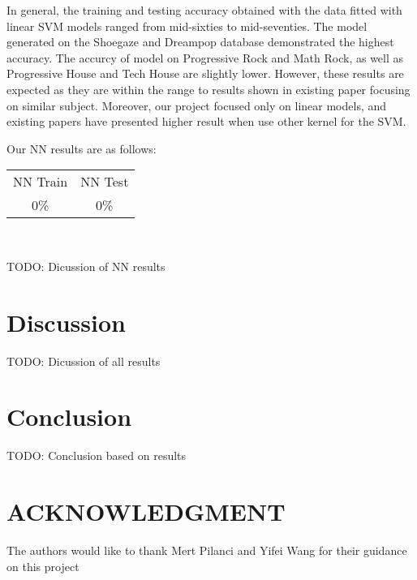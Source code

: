 \documentclass[letterpaper, 12 pt, conference]{ieeeconf}  %
\begin{document}
\par In general, the training and testing accuracy obtained with the data fitted with linear SVM models ranged from mid-sixties to mid-seventies. The model generated on the Shoegaze and Dreampop database demonstrated the highest accuracy. The accurcy of model on Progressive Rock and Math Rock, as well as Progressive House and Tech House are slightly lower. However, these results are expected as they are within the range to results shown in existing paper focusing on similar subject. Moreover, our project focused only on linear models, and existing papers have presented higher result when use other kernel for the SVM. 
\newline \,\,



\par Our NN results are as follows:
\begin{center}
    \begin{tabular}{ |c|c| }
 NN Train & NN Test \\ 
 0\% & 0\%  \\

\end{tabular}\\
\end{center}


\par TODO: Dicussion of NN results
\newline \,\,



 

\section{Discussion}

TODO: Dicussion of all results


\section{Conclusion}


TODO: Conclusion based on results



\section*{ACKNOWLEDGMENT}

The authors would like to thank Mert Pilanci and Yifei Wang for their guidance on this project
\end{document}
